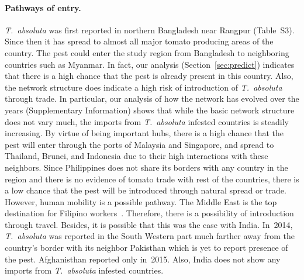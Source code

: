 \documentclass[11pt]{article}
\newcommand{\tuta}{\emph{T.~absoluta}}
\theoremstyle{definition}
\begin{document}
\paragraph{Pathways of entry.} \tuta{} was first reported in northern
Bangladesh near Rangpur (Table~S3).  Since then it has spread to almost all
major tomato producing areas of the country. The pest could enter the study
region from Bangladesh to neighboring countries such as Myanmar. In fact,
our analysis (Section~\ref{sec:predict}) indicates that there is a high
chance that the pest is already present in this country. Also, the network
structure does indicate a high risk of introduction of \tuta{} through
trade. In particular, our analysis of how the network has evolved over the
years (Supplementary Information) shows that while the basic network
structure does not vary much, the imports from \tuta{} infested countries
is steadily increasing.  By virtue of being important hubs, there is a high
chance that the pest will enter through the ports of Malaysia and
Singapore, and spread to Thailand, Brunei, and Indonesia due to their high
interactions with these neighbors. Since Philippines does not share its
borders with any country in the region and there is no evidence of tomato
trade with rest of the countries, there is a low chance that the pest will
be introduced through natural spread or trade.  However, human mobility is
a possible pathway. The Middle East is the top destination for Filipino
workers~\cite{rodriguez2011philippine}. Therefore, there is a possibility
of introduction through travel. Besides, it is possible that this was the
case with India. In~2014, \tuta{} was reported in the South Western part
much farther away from the country's border with its neighbor Pakisthan
which is yet to report presence of the pest.  Afghanisthan reported only
in~2015. Also, India does not show any imports from \tuta{} infested
countries.
\end{document}
